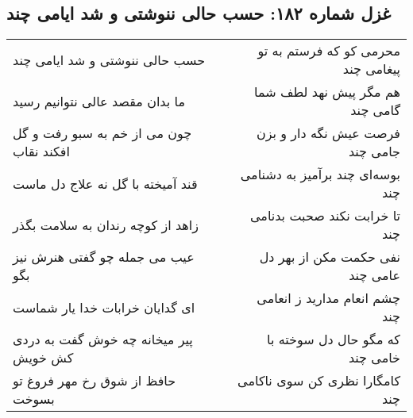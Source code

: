 \begin{center}
\section*{غزل شماره ۱۸۲: حسب حالی ننوشتی و شد ایامی چند}
\label{sec:sh182}
\begin{longtable}{l p{0.5cm} r}
حسب حالی ننوشتی و شد ایامی چند
&&
محرمی کو که فرستم به تو پیغامی چند
\\
ما بدان مقصد عالی نتوانیم رسید
&&
هم مگر پیش نهد لطف شما گامی چند
\\
چون می از خم به سبو رفت و گل افکند نقاب
&&
فرصت عیش نگه دار و بزن جامی چند
\\
قند آمیخته با گل نه علاج دل ماست
&&
بوسه‌ای چند برآمیز به دشنامی چند
\\
زاهد از کوچه رندان به سلامت بگذر
&&
تا خرابت نکند صحبت بدنامی چند
\\
عیب می جمله چو گفتی هنرش نیز بگو
&&
نفی حکمت مکن از بهر دل عامی چند
\\
ای گدایان خرابات خدا یار شماست
&&
چشم انعام مدارید ز انعامی چند
\\
پیر میخانه چه خوش گفت به دردی کش خویش
&&
که مگو حال دل سوخته با خامی چند
\\
حافظ از شوق رخ مهر فروغ تو بسوخت
&&
کامگارا نظری کن سوی ناکامی چند
\\
\end{longtable}
\end{center}
